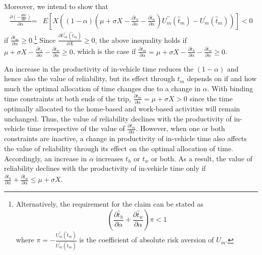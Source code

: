 \documentclass[12pt,a4paper,british]{article}
\makeatletter
\theoremstyle{definition}
\theoremstyle{plain}
\newenvironment{proof}[1][\proofname]{\par
    \normalfont\topsep6\p@\@plus6\p@\relax
    \trivlist
    \itemindent\parindent
    \item[\hskip\labelsep
          \scshape
      #1]\ignorespaces
  }{%
    \endtrivlist\@endpefalse
  }
\providecommand{\proofname}{Proof}
\theoremstyle{plain}
\theoremstyle{plain}
\makeatother
\begin{document}
\begin{proof}
Moreover, we intend to show that
\begin{align*}
\frac{\partial\left(-\frac{dW}{d\sigma}\right)}{\partial\alpha}\text{=} & E\left[X\left(\left(1-\alpha\right)\left(\mu+\sigma X-\frac{\partial\hat{t}_{h}}{\partial\alpha}-\frac{\partial\hat{t}_{w}}{\partial\alpha}\right)U_{m}^{\prime\prime}\left(\hat{t}_{m}\right)-U_{m}^{\prime}\left(\hat{t}_{m}\right)\right)\right]<0
\end{align*}
if $\frac{\partial\hat{t}_{m}}{\partial\alpha}\geq0$.\footnote{Alternatively, the requirement for the claim can be stated as%
\begin{equation*}
\left(\frac{\partial\hat{t}_{h}}{\partial\alpha}+\frac{\partial\hat{t}_{w}}{\partial\alpha}\right)\pi<1
\end{equation*}%
where $\pi=-\frac{U_{m}^{\prime\prime}\left(\hat{t}_{m}\right)}{U_{m}^{\prime}\left(\hat{t}_{m}\right)}$ is the coefficient of absolute risk aversion of $U_{m}$.} Since $\frac{\partial U_{m}^{\prime}\left(\hat{t}_{m}\right)}{\partial X}\geq0$, the above inequality holds if $\mu+\sigma X-\frac{\partial\hat{t}_{h}}{\partial\alpha}-\frac{\partial\hat{t}_{w}}{\partial\alpha}\geq0$, which is the case if $\frac{\partial\hat{t}_{m}}{\partial\alpha}=\mu+\sigma X-\frac{\partial\hat{t}_{h}}{\partial\alpha}-\frac{\partial\hat{t}_{w}}{\partial\alpha}\geq0$.
\end{proof}

An increase in the productivity of in-vehicle time reduces the $\left(1-\alpha\right)$ and hence also the value of reliability, but its effect through $t_{m}$ depends on if and how much the optimal allocation of time changes due to a change in $\alpha$. With binding time constraints at both ends of the trip, $\frac{\partial t_{m}}{\partial\alpha}=\mu+\sigma X>0$ since the time optimally allocated to the home-based and work-based activities will remain unchanged. Thus, the value of reliability declines with the productivity of in-vehicle time irrespective of the value of $\frac{\partial t_{m}}{\partial\alpha}$. However, when one or both constraints are inactive, a change in productivity of in-vehicle time also affects the value of reliability through its effect on the optimal allocation of time. Accordingly, an increase in $\alpha$ increases $t_{h}$ or $t_{w}$ or both. As a result, the value of reliability declines with the productivity of in-vehicle time only if $\frac{\partial\hat{t}_{h}}{\partial\alpha}+\frac{\partial\hat{t}_{w}}{\partial\alpha}\leq\mu+\sigma X$.

\clearpage{}
\end{document}
